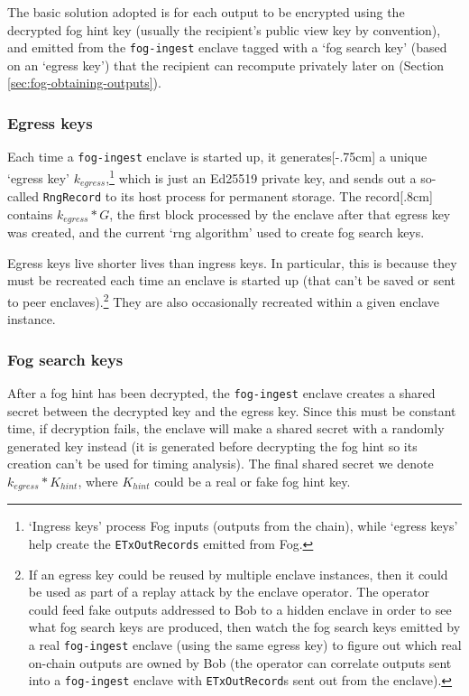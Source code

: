 The basic solution adopted is for each output to be encrypted using the decrypted fog hint key (usually the recipient's public view key by convention), and emitted from the {\tt fog-ingest} enclave tagged with a `fog search key' (based on an `egress key') that the recipient can recompute privately later on (Section \ref{sec:fog-obtaining-outputs}).

\subsubsection{Egress keys}

Each time a {\tt fog-ingest} enclave is started up, it generates[-.75cm] a unique `egress key' $k_{egress}$,\footnote{`Ingress keys' process Fog inputs (outputs from the chain), while `egress keys' help create the {\tt ETxOutRecords} emitted from Fog.} which is just an Ed25519 private key, and sends out a so-called {\tt RngRecord} to its host process for permanent storage. The record[.8cm] contains $k_{egress}*G$, the first block processed by the enclave after that egress key was created, and the current `rng algorithm' used to create fog search keys.

Egress keys live shorter lives than ingress keys. In particular, this is because they must be recreated each time an enclave is started up (that can't be saved or sent to peer enclaves).\footnote{If an egress key could be reused by multiple enclave instances, then it could be used as part of a replay attack by the enclave operator. The operator could feed fake outputs addressed to Bob to a hidden enclave in order to see what fog search keys are produced, then watch the fog search keys emitted by a real {\tt fog-ingest} enclave (using the same egress key) to figure out which real on-chain outputs are owned by Bob (the operator can correlate outputs sent into a {\tt fog-ingest} enclave with {\tt ETxOutRecord}s sent out from the enclave).} They are also occasionally recreated within a given enclave instance.

\subsubsection{Fog search keys}

After a fog hint has been decrypted, the {\tt fog-ingest} enclave creates a shared secret between the decrypted key and the egress key. Since this must be constant time, if decryption fails, the enclave will make a shared secret with a randomly generated key instead (it is generated before decrypting the fog hint so its creation can't be used for timing analysis). The final shared secret we denote $k_{egress}*K_{hint}$, where $K_{hint}$ could be a real or fake fog hint key.

